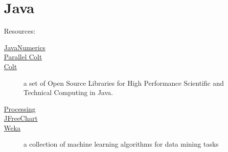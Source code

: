 \chapter{Java}

Resources:

\begin{description}
\item [\href{http://math.nist.gov/javanumerics/}{JavaNumerics}]
\item [\href{https://sites.google.com/site/piotrwendykier/software/parallelcolt}{Parallel Colt}]
\item [\href{http://acs.lbl.gov/software/colt/}{Colt}] a set of Open Source Libraries for High Performance Scientific and Technical Computing in Java.
\item [\href{http://www.processing.org/}{Processing}]
\item [\href{http://www.jfree.org/jfreechart/}{JFreeChart}]
\item [\href{http://www.cs.waikato.ac.nz/ml/weka/}{Weka}]  a collection of machine learning algorithms for data mining tasks
\end{description}
